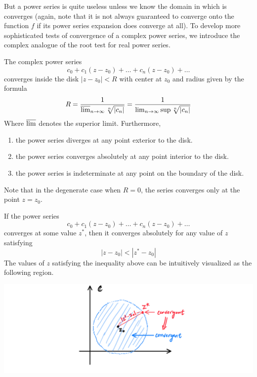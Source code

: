 \documentclass{article}
\begin{document}
    But a power series is quite useless unless we know the domain in which is converges (again, note that it is not always guaranteed to converge onto the function $f$ if its power series expansion does converge at all). To develop more sophisticated tests of convergence of a complex power series, we introduce the complex analogue of the root test for real power series. 

    \begin{theorem}
    The complex power series 
    \[c_0 + c_1 (z - z_0) + \ldots + c_n (z - z_0) + \ldots\]
    converges inside the disk $|z - z_0| < R$ with center at $z_0$ and radius given by the formula
    \[R = \frac{1}{\varlimsup_{n \rightarrow \infty} \sqrt[n]{|c_n|}} = \frac{1}{\lim_{n \rightarrow \infty} \sup{\sqrt[n]{|c_n|}}}\]
    Where $\varlimsup$ denotes the superior limit. Furthermore, 
    \begin{enumerate}
      \item the power series diverges at any point exterior to the disk. 
      \item the power series converges absolutely at any point interior to the disk. 
      \item the power series is indeterminate at any point on the boundary of the disk. 
    \end{enumerate}
    Note that in the degenerate case when $R = 0$, the series converges only at the point $z = z_0$. 
    \end{theorem}

    \begin{corollary}
    If the power series 
    \[c_0 + c_1 (z - z_0) + \ldots + c_n (z - z_0) + \ldots\]
    converges at some value $z^*$, then it converges absolutely for any value of $z$ satisfying
    \[|z - z_0| < |z^* - z_0|\]
    The values of $z$ satisfying the inequality above can be intuitively visualized as the following region. 
    \begin{center}
        \includegraphics[scale=0.25]{img/Abels_First_Theorem.PNG}
    \end{center}
    \end{corollary}
\end{document}
